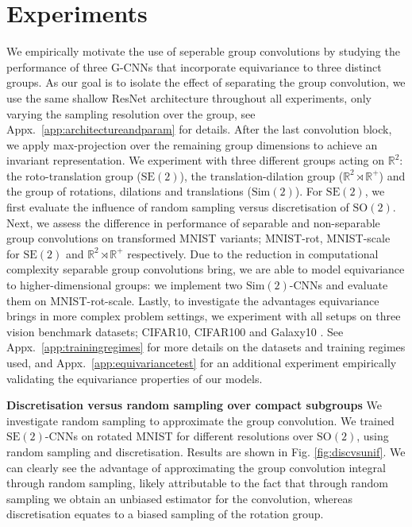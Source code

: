 \documentclass[nohyperref]{article}
\theoremstyle{plain}
\theoremstyle{definition}
\theoremstyle{remark}
\newcommand{\R}{\mathbb{R}}
\begin{document}
\section{Experiments}\label{sec:experiments}
We empirically motivate the use of seperable group convolutions by studying the performance of three G-CNNs that incorporate equivariance to three distinct groups. As our goal is to isolate the effect of separating the group convolution, we use the same shallow ResNet architecture throughout all experiments, only varying the sampling resolution over the group, see Appx.~\ref{app:architectureandparam} for details. After the last convolution block, we apply max-projection over the remaining group dimensions to achieve an invariant representation. We experiment with three different groups acting on $\mathbb{R}^{2}$: the roto-translation group ($\mathrm{SE(2)}$), the translation-dilation group ($\mathrm{\R^2\rtimes \R^+}$) and the group of rotations, dilations and translations ($\mathrm{Sim(2)}$). For $\mathrm{SE(2)}$, we first evaluate the influence of random sampling versus discretisation of $\mathrm{SO(2)}$. Next, we assess the difference in performance of separable and non-separable group convolutions on transformed MNIST variants; MNIST-rot, MNIST-scale for $\mathrm{SE(2)}$ and $\mathrm{\R^2 \rtimes \R^+}$ respectively. Due to the reduction in computational complexity separable group convolutions bring, we are able to model equivariance to higher-dimensional groups: we implement two $\mathrm{Sim(2)}$-CNNs and evaluate them on MNIST-rot-scale. Lastly, to investigate the advantages equivariance brings in more complex problem settings, we experiment with all setups on three vision benchmark datasets; CIFAR10, CIFAR100 \citep{krizhevsky2009learning} and Galaxy10 \citep{leung2019deep}. See Appx.~\ref{app:trainingregimes} for more details on the datasets and training regimes used, and Appx.~\ref{app:equivariancetest} for an additional experiment empirically validating the equivariance properties of our models.

\textbf{Discretisation versus random sampling over compact subgroups} \label{app:discvsuniform} We investigate random sampling to approximate the group convolution. We trained $\mathrm{SE(2)}$-CNNs on rotated MNIST for different resolutions over $\mathrm{SO(2)}$, using random sampling and discretisation. Results are shown in Fig. \ref{fig:discvsunif}. We can clearly see the advantage of approximating the group convolution integral through random sampling, likely attributable to the fact that through random sampling we obtain an unbiased estimator for the convolution, whereas discretisation equates to a biased sampling of the rotation group. 
\end{document}
